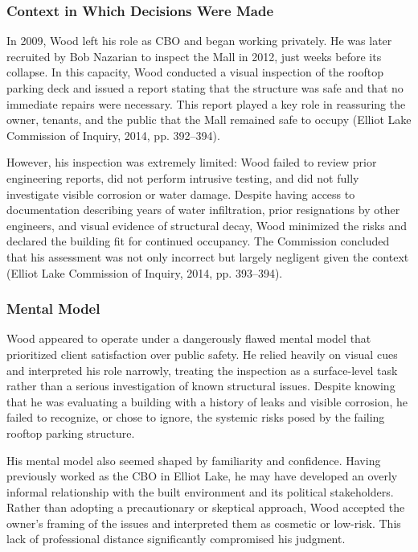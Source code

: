 \documentclass[12pt]{article}
\begin{document}
\subsubsection*{Context in Which Decisions Were Made}
In 2009, Wood left his role as CBO and began working privately. He was later recruited by Bob Nazarian to inspect the Mall in 2012, just weeks before its collapse. In this capacity, Wood conducted a visual inspection of the rooftop parking deck and issued a report stating that the structure was safe and that no immediate repairs were necessary. This report played a key role in reassuring the owner, tenants, and the public that the Mall remained safe to occupy (Elliot Lake Commission of Inquiry, 2014, pp. 392–394).

However, his inspection was extremely limited: Wood failed to review prior engineering reports, did not perform intrusive testing, and did not fully investigate visible corrosion or water damage. Despite having access to documentation describing years of water infiltration, prior resignations by other engineers, and visual evidence of structural decay, Wood minimized the risks and declared the building fit for continued occupancy. The Commission concluded that his assessment was not only incorrect but largely negligent given the context (Elliot Lake Commission of Inquiry, 2014, pp. 393–394).


\subsubsection*{Mental Model}
Wood appeared to operate under a dangerously flawed mental model that prioritized client satisfaction over public safety. He relied heavily on visual cues and interpreted his role narrowly, treating the inspection as a surface-level task rather than a serious investigation of known structural issues. Despite knowing that he was evaluating a building with a history of leaks and visible corrosion, he failed to recognize, or chose to ignore, the systemic risks posed by the failing rooftop parking structure.

His mental model also seemed shaped by familiarity and confidence. Having previously worked as the CBO in Elliot Lake, he may have developed an overly informal relationship with the built environment and its political stakeholders. Rather than adopting a precautionary or skeptical approach, Wood accepted the owner’s framing of the issues and interpreted them as cosmetic or low-risk. This lack of professional distance significantly compromised his judgment.
\end{document}
